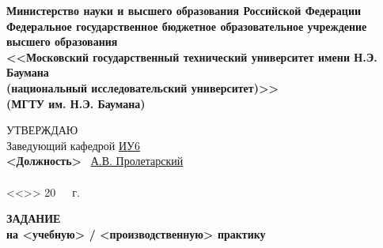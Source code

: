 \documentclass[utf8x, 10pt, oneside, a4paper]{article}
\begin{document}
	\thispagestyle{empty}
	\begin{center}
		\textbf{Министерство науки и высшего образования Российской Федерации 
		\\ Федеральное государственное бюджетное образовательное учреждение 
		\\ высшего образования 
		\\ <<Московский государственный технический университет имени Н.Э. Баумана
		\\ (национальный исследовательский университет)>>
		\\ (МГТУ им. Н.Э. Баумана)}
		\fontsize{12pt}{0.15\baselineskip}\selectfont
		\noindent \makebox[\linewidth]{\rule{\textwidth}{4pt}} \makebox[\linewidth]{\rule{\textwidth}{1pt}}
	\end{center}	
	\normalsize
	\begin{flushright}
		УТВЕРЖДАЮ \hspace*{1.4cm}
		\\
		Заведующий кафедрой \uline{\hspace*{0.5cm}}\uline{ИУ6}\uline{\hspace*{0.5cm}} 
		\\ \hfill \textbf{<Должность>} \uline{\hspace*{2.5cm}} \ \uline{А.В. Пролетарский} 
		\\ \hfill
		\\ <<\uline{\hspace*{1cm}}>> \uline{\hspace*{2.5cm}} 20\ \ \   г. %
	\end{flushright}

	\begin{center}
		\fontsize{18pt}{\baselineskip}\selectfont \textbf{ЗАДАНИЕ}
		\\ \fontsize{16pt}{\baselineskip}\selectfont \textbf{на <учебную> / <производственную> практику} %
	\end{center}

	\normalsize
\end{document}
